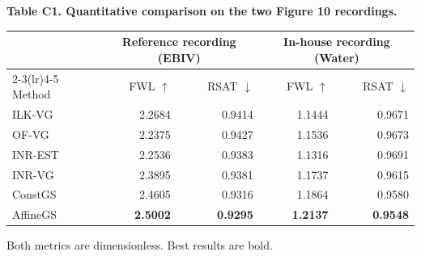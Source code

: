 \documentclass[10pt]{article}
\begin{document}
\begin{center}
\textbf{Table C1. Quantitative comparison on the two Figure 10 recordings.}
\par\medskip
\begin{tabular}{lrrrr}
\toprule
& \multicolumn{2}{c}{Reference recording (EBIV)} & \multicolumn{2}{c}{In-house recording (Water)} \\
\cmidrule(lr){2-3}\cmidrule(lr){4-5}
Method & FWL $\uparrow$ & RSAT $\downarrow$ & FWL $\uparrow$ & RSAT $\downarrow$ \\
\midrule
ILK-VG & 2.2684 & 0.9414 & 1.1444 & 0.9671 \\
OF-VG & 2.2375 & 0.9427 & 1.1536 & 0.9673 \\
INR-EST & 2.2536 & 0.9383 & 1.1316 & 0.9691 \\
INR-VG & 2.3895 & 0.9381 & 1.1737 & 0.9615 \\
ConstGS & 2.4605 & 0.9316 & 1.1864 & 0.9580 \\
AffineGS & \textbf{2.5002} & \textbf{0.9295} & \textbf{1.2137} & \textbf{0.9548} \\
\bottomrule
\end{tabular}
\par\medskip
Both metrics are dimensionless. Best results are bold.
\end{center}
\end{document}
